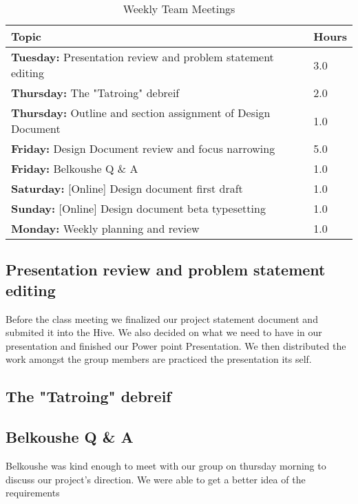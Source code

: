 \documentclass[12pt,article,compsoc]{IEEEtran}
\begin{document}
	
	\begin{table}[ht]
		\renewcommand{\arraystretch}{1.3}
			\caption{Weekly Team Meetings}
			
			\label{Team Hour Summary}
			
			\centering
			\begin{tabular}{p{7cm}|p{1cm}}
			\hline
			{\bfseries 	Topic} 																		&{\bfseries Hours}		\\
			\hline\hline
						{\bfseries Tuesday:} Presentation review and problem statement editing		& 3.0					\\
						{\bfseries Thursday:} The "Tatroing" debreif								& 2.0					\\
						{\bfseries Thursday:} Outline and section assignment of Design Document		& 1.0 					\\	
						{\bfseries Friday:}	Design Document review and focus narrowing				& 5.0					\\
						{\bfseries Friday:}	Belkoushe Q \& A										& 1.0 					\\
						{\bfseries Saturday:} [Online] Design document first draft					& 1.0 					\\
						{\bfseries Sunday:}	[Online] Design document beta typesetting				& 1.0 					\\
						{\bfseries Monday:} Weekly planning and review 								& 1.0 					\\	
			\hline
			\end{tabular}
		\end{table}
		 
	\subsection{Presentation review and problem statement editing}
				Before the class meeting we finalized our project statement document and submited it into 
    			the Hive. We also decided on what we need to have in our presentation and finished our Power
                point Presentation. We then distributed the work amongst the group members are practiced
                the presentation its self.
	\subsection{The "Tatroing" debreif}
		        
	\subsection{Belkoushe Q \& A}
                Belkoushe was kind enough to meet with our group on thursday morning to discuss our project's
                direction. We were able to get a better idea of the requirements
\end{document}
